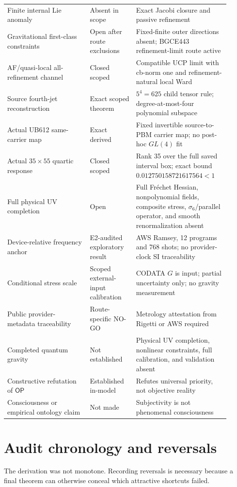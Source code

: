 \documentclass[11pt]{article}
\theoremstyle{definition}
\theoremstyle{remark}
\newcommand{\OPT}{\mathsf{OP}}
\begin{document}
\begin{longtable}{>{\raggedright\arraybackslash}p{0.34\linewidth} >{\raggedright\arraybackslash}p{0.19\linewidth} >{\raggedright\arraybackslash}p{0.38\linewidth}}
Finite internal Lie anomaly & Absent in scope & Exact Jacobi closure and passive refinement \\
Gravitational first-class constraints & Open after route exclusions & Fixed-finite outer directions absent; BGCE443 refinement-limit route active \\
AF/quasi-local all-refinement channel & Closed scoped & Compatible UCP limit with cb-norm one and refinement-natural local Ward \\
Source fourth-jet reconstruction & Exact scoped theorem & $5^4=625$ child tensor rule; degree-at-most-four polynomial subspace \\
Actual UB612 same-carrier map & Exact derived & Fixed invertible source-to-PBM carrier map; no post-hoc $GL(4)$ fit \\
Actual $35\times55$ quartic response & Closed scoped & Rank 35 over the full saved interval box; exact bound $0.012750158721617564<1$ \\
Full physical UV completion & Open & Full Fr\'echet Hessian, nonpolynomial fields, composite stress, $\sigma_6$/parallel operator, and smooth renormalization absent \\
Device-relative frequency anchor & E2-audited exploratory result & AWS Ramsey, 12 programs and 768 shots; no provider-clock SI traceability \\
Conditional stress scale & Scoped external-input calibration & CODATA $G$ is input; partial uncertainty only; no gravity measurement \\
Public provider-metadata traceability & Route-specific NO-GO & Metrology attestation from Rigetti or AWS required \\
Completed quantum gravity & Not established & Physical UV completion, nonlinear constraints, full calibration, and validation absent \\
Constructive refutation of $\OPT$ & Established in-model & Refutes universal priority, not objective reality \\
Consciousness or empirical ontology claim & Not made & Subjectivity is not phenomenal consciousness \\
\bottomrule
\end{longtable}

\section{Audit chronology and reversals}

The derivation was not monotone. Recording reversals is necessary because a final theorem can otherwise conceal which attractive shortcuts failed.
\end{document}
